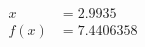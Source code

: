 \documentclass[preview]{standalone}
\begin{document}
\begin{align*}
x &= 2.9935\\f(x) &= 7.4406358
\end{align*}
\end{document}
